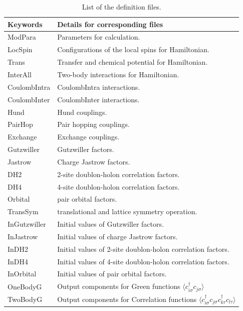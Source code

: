  \begin{table}[h!]
\begin{center}
  \begin{tabular}{|ll|} \hline
           Keywords     & Details for corresponding files       \\   \hline\hline
           ModPara       &  Parameters for calculation.        \\ \hline 
           LocSpin         &  Configurations of the local spins for Hamiltonian.         \\ 
           Trans       &   Transfer and chemical potential for Hamiltonian.  \\
           InterAll  &   Two-body interactions for Hamiltonian. \\  
           CoulombIntra  &   CoulombIntra interactions. \\  
           CoulombInter  &   CoulombInter  interactions. \\  
           Hund  &   Hund couplings. \\  
           PairHop  &  Pair hopping couplings. \\  
           Exchange  &  Exchange couplings. \\  \hline
           Gutzwiller & Gutzwiller factors.\\
           Jastrow & Charge Jastrow factors.\\
           DH2 & 2-site doublon-holon correlation factors.\\
           DH4 & 4-site doublon-holon correlation factors.\\
           Orbital & pair orbital factors.\\
           TransSym & translational and lattice symmetry operation. \\ \hline
           InGutzwiller & Initial values of Gutzwiller factors.\\
           InJastrow & Initial values of charge Jastrow factors.\\
           InDH2 & Initial values of 2-site doublon-holon correlation factors.\\
           InDH4 & Initial values of 4-site doublon-holon correlation factors.\\
           InOrbital & Initial values of pair orbital factors.\\ \hline
           OneBodyG         &   Output components for Green functions $\langle c_{i\sigma}^{\dagger}c_{j\sigma}\rangle$           \\   
           TwoBodyG &   Output components for Correlation functions $\langle c_{i\sigma}^{\dagger}c_{j\sigma}c_{k\tau}^{\dagger}c_{l\tau}\rangle$  \\   \hline
  \end{tabular}
\end{center}
\caption{List of the definition files.}
\label{Table:Defs}
\end{table}%

